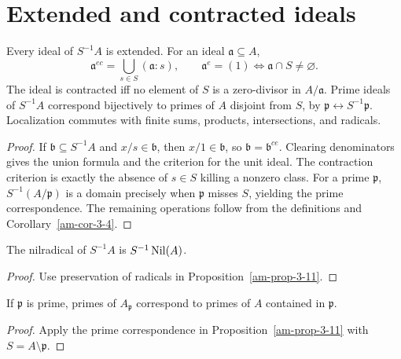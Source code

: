 \section{Extended and contracted ideals}
\label{am-ch3-ideals}
\begin{proposition}
\label{am-prop-3-11}
\uses{}
Every ideal of $S^{-1}A$ is extended.  For an ideal $\mathfrak{a}\subseteq A$,
\[
\mathfrak{a}^{ec}=\bigcup_{s\in S}(\mathfrak{a}:s),\qquad
\mathfrak{a}^e=(1)\Longleftrightarrow\mathfrak{a}\cap S\ne\varnothing.
\]
The ideal is contracted iff no element of $S$ is a zero-divisor in $A/\mathfrak{a}$.
Prime ideals of $S^{-1}A$ correspond bijectively to primes of $A$ disjoint
from $S$, by $\mathfrak{p}\leftrightarrow S^{-1}\mathfrak{p}$.  Localization commutes with finite
sums, products, intersections, and radicals.
\end{proposition}
\begin{proof}
If $\mathfrak{b}\subseteq S^{-1}A$ and $x/s\in\mathfrak{b}$, then $x/1\in\mathfrak{b}$,
so $\mathfrak{b}=\mathfrak{b}^{ce}$.  Clearing denominators gives the union
formula and the criterion for the unit ideal.  The contraction criterion is
exactly the absence of $s\in S$ killing a nonzero class.  For a prime $\mathfrak{p}$,
$S^{-1}(A/\mathfrak{p})$ is a domain precisely when $\mathfrak{p}$ misses $S$, yielding the prime
correspondence.  The remaining operations follow from the definitions and
Corollary~\ref{am-cor-3-4}.
\end{proof}
\begin{corollary}
\label{am-cor-3-12}
\uses{}
The nilradical of $S^{-1}A$ is $S^{-1}\operatorname{Nil}(A)$.
\end{corollary}
\begin{proof}
Use preservation of radicals in Proposition~\ref{am-prop-3-11}.
\end{proof}
\begin{corollary}
\label{am-cor-3-13}
\uses{}
If $\mathfrak{p}$ is prime, primes of $A_\mathfrak{p}$ correspond to primes of $A$ contained in
$\mathfrak{p}$.
\end{corollary}
\begin{proof}
Apply the prime correspondence in Proposition~\ref{am-prop-3-11} with
$S=A\setminus\mathfrak{p}$.
\end{proof}
